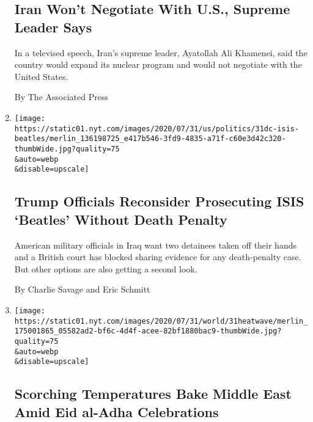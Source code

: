 \begin{enumerate}
  \hypertarget{iran-wont-negotiate-with-us-supreme-leader-says}{%
  \subsection{Iran Won't Negotiate With U.S., Supreme Leader
  Says}\label{iran-wont-negotiate-with-us-supreme-leader-says}}

  In a televised speech, Iran's supreme leader, Ayatollah Ali Khamenei,
  said the country would expand its nuclear program and would not
  negotiate with the United States.

  By The Associated Press
\item
  \href{/2020/07/31/world/middleeast/isis-beatles-hostages.html}{}

  \texttt{[image: https://static01.nyt.com/images/2020/07/31/us/politics/31dc-isis-beatles/merlin\_136198725\_e417b546-3fd9-4835-a71f-c60e3d42c320-thumbWide.jpg?quality=75\\\&auto=webp\\\&disable=upscale]}

  \hypertarget{trump-officials-reconsider-prosecuting-isis-beatles-without-death-penalty}{%
  \subsection{Trump Officials Reconsider Prosecuting ISIS `Beatles'
  Without Death
  Penalty}\label{trump-officials-reconsider-prosecuting-isis-beatles-without-death-penalty}}

  American military officials in Iraq want two detainees taken off their
  hands and a British court has blocked sharing evidence for any
  death-penalty case. But other options are also getting a second look.

  By Charlie Savage and Eric Schmitt
\item
  \href{/2020/07/31/world/middleeast/Middle-East-heat-wave.html}{}

  \texttt{[image: https://static01.nyt.com/images/2020/07/31/world/31heatwave/merlin\_175001865\_05582ad2-bf6c-4d4f-acee-82bf1880bac9-thumbWide.jpg?quality=75\\\&auto=webp\\\&disable=upscale]}

  \hypertarget{scorching-temperatures-bake-middle-east-amid-eid-al-adha-celebrations}{%
  \subsection{Scorching Temperatures Bake Middle East Amid Eid al-Adha
  Celebrations}\label{scorching-temperatures-bake-middle-east-amid-eid-al-adha-celebrations}}


\end{enumerate}
